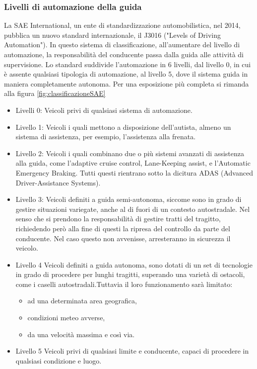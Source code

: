 \documentclass[14pt]{extarticle}
\begin{document}
\subsubsection{Livelli di automazione della guida}
La SAE International, un ente di standardizzazione automobilistica,  nel 2014, pubblica un nuovo standard internazionale, il J3016 ("Levels of Driving Automation").
In questo sistema di classificazione, all'aumentare del livello di automazione, la responsabilità del conducente passa dalla guida alle attività di
supervisione.
Lo standard suddivide l'automazione in 6 livelli, dal livello 0, in cui è assente qualsiasi tipologia di automazione, al livello 5, dove il sistema guida in maniera completamente autonoma.
Per una esposizione più completa si rimanda alla figura \ref{fig:classificazioneSAE}

\begin{itemize}
\item Livelli 0:
Veicoli privi di qualsiasi sistema di automazione.
\item Livello 1: 
Veicoli  i quali mettono a disposizione dell'autista, almeno un sistema di assistenza, per esempio, l'assistenza alla frenata.
\item Livello 2:
Veicoli i quali combinano due o più sistemi avanzati di assistenza alla guida, come l'adaptive cruise control, Lane-Keeping assist, e l'Automatic Emergency Braking. Tutti questi rientrano sotto la dicitura ADAS (Advanced Driver-Assistance Systems). 
\item Livello 3:
Veicoli definiti a guida semi-autonoma, siccome sono in grado di  gestire situazioni variegate, anche al di fuori di un contesto autostradale. Nel senso che si prendono la responsabilità di gestire tratti del tragitto, richiedendo però alla fine di questi la ripresa del controllo da parte del conducente. Nel caso questo non avvenisse, arresteranno in sicurezza il  veicolo.
\item Livello 4
Veicoli definiti a guida autonoma, sono dotati di un set di tecnologie in grado di procedere per lunghi tragitti, superando una varietà di ostacoli, come i caselli autostradali.Tuttavia il loro funzionamento sarà limitato:
\begin{itemize}
\item ad una determinata area geografica,
\item condizioni meteo avverse,
\item da una velocità massima e così via.
\end{itemize}
\item Livello 5
Veicoli privi di qualsiasi limite e conducente, capaci di procedere in qualsiasi condizione e luogo.
\end{itemize}
\end{document}
